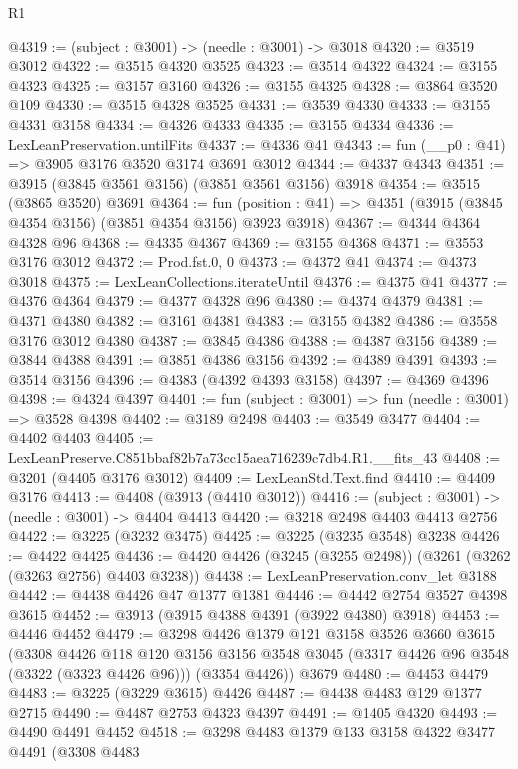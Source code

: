 \begin{lexlean}{R1}
\begin{coremodule}
@4319 := (subject : @3001) -> (needle : @3001) -> @3018
@4320 := @3519 @3012
@4322 := @3515 @4320 @3525
@4323 := @3514 @4322
@4324 := @3155 @4323
@4325 := @3157 @3160
@4326 := @3155 @4325
@4328 := @3864 @3520 @109
@4330 := @3515 @4328 @3525
@4331 := @3539 @4330
@4333 := @3155 @4331 @3158
@4334 := @4326 @4333
@4335 := @3155 @4334
@4336 := LexLeanPreservation.untilFits
@4337 := @4336 @41
@4343 := fun (__p0 : @41) => @3905 @3176 @3520 @3174 @3691 @3012
@4344 := @4337 @4343
@4351 := @3915 (@3845 @3561 @3156) (@3851 @3561 @3156) @3918
@4354 := @3515 (@3865 @3520) @3691
@4364 := fun (position : @41) => @4351 (@3915 (@3845 @4354 @3156) (@3851 @4354 @3156) @3923 @3918)
@4367 := @4344 @4364 @4328 @96
@4368 := @4335 @4367
@4369 := @3155 @4368
@4371 := @3553 @3176 @3012
@4372 := Prod.fst.{0, 0}
@4373 := @4372 @41
@4374 := @4373 @3018
@4375 := LexLeanCollections.iterateUntil
@4376 := @4375 @41
@4377 := @4376 @4364
@4379 := @4377 @4328 @96
@4380 := @4374 @4379
@4381 := @4371 @4380
@4382 := @3161 @4381
@4383 := @3155 @4382
@4386 := @3558 @3176 @3012 @4380
@4387 := @3845 @4386
@4388 := @4387 @3156
@4389 := @3844 @4388
@4391 := @3851 @4386 @3156
@4392 := @4389 @4391
@4393 := @3514 @3156
@4396 := @4383 (@4392 @4393 @3158)
@4397 := @4369 @4396
@4398 := @4324 @4397
@4401 := fun (subject : @3001) => fun (needle : @3001) => @3528 @4398
@4402 := @3189 @2498
@4403 := @3549 @3477
@4404 := @4402 @4403
@4405 := LexLeanPreserve.C851bbaf82b7a73cc15aea716239c7db4.R1.__fits_43
@4408 := @3201 (@4405 @3176 @3012)
@4409 := LexLeanStd.Text.find
@4410 := @4409 @3176
@4413 := @4408 (@3913 (@4410 @3012))
@4416 := (subject : @3001) -> (needle : @3001) -> @4404 @4413
@4420 := @3218 @2498 @4403 @4413 @2756
@4422 := @3225 (@3232 @3475)
@4425 := @3225 (@3235 @3548) @3238
@4426 := @4422 @4425
@4436 := @4420 @4426 (@3245 (@3255 @2498)) (@3261 (@3262 (@3263 @2756) @4403 @3238))
@4438 := LexLeanPreservation.conv_let @3188
@4442 := @4438 @4426 @47 @1377 @1381
@4446 := @4442 @2754 @3527 @4398 @3615
@4452 := @3913 (@3915 @4388 @4391 (@3922 @4380) @3918)
@4453 := @4446 @4452
@4479 := @3298
    @4426
    @1379
    @121
    @3158
    @3526
    @3660
    @3615
    (@3308
      @4426
      @118
      @120
      @3156
      @3156
      @3548
      @3045
      (@3317 @4426 @96 @3548 (@3322 (@3323 @4426 @96)))
      (@3354 @4426))
    @3679
@4480 := @4453 @4479
@4483 := @3225 (@3229 @3615) @4426
@4487 := @4438 @4483 @129 @1377 @2715
@4490 := @4487 @2753 @4323 @4397
@4491 := @1405 @4320
@4493 := @4490 @4491 @4452
@4518 := @3298
    @4483
    @1379
    @133
    @3158
    @4322
    @3477
    @4491
    (@3308
      @4483

\end{coremodule}
\end{lexlean}
